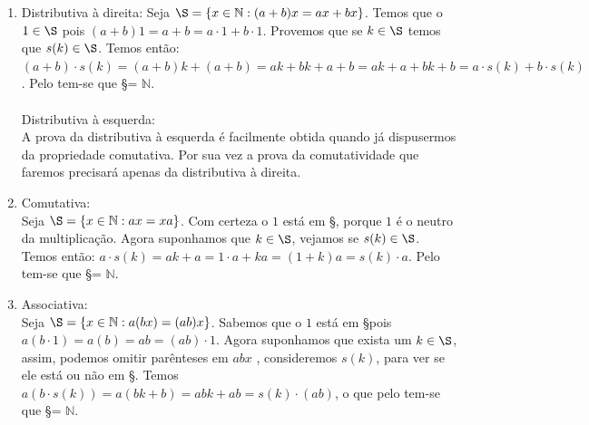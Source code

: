 \documentclass[../main.tex]{subfiles}
\begin{document}
\begin{dem}
\begin{enumerate}[label=(\roman*)]
        \item Distributiva à direita: 
            Seja $\S = \{ x \in \mathbb{N} : ( a + b ) x = ax + bx \}$. Temos que o $1 \in \S$ pois $( a + b ) 1 = a + b = a \cdot 1 + b \cdot 1$. Provemos que se $k \in \S$ temos que $s(k) \in \S$. Temos então: \\
            $( a + b ) \cdot s(k)= ( a + b ) k + ( a + b ) = ak + bk + a + b = ak + a + bk + b 
            = a \cdot s(k) + b \cdot s(k)$. Pelo  tem-se que \S = $\mathbb{N}$.
            \\ \\
            Distributiva à esquerda: \\
            A prova da distributiva à esquerda é facilmente obtida quando já dispusermos da propriedade comutativa. Por sua vez a prova da comutatividade que faremos precisará apenas da distributiva à direita.
        \item Comutativa: \\
            Seja $\S = \{ x \in \mathbb{N} : ax = xa \}$. Com certeza o $1$ está em \S, porque $1$ é o neutro da multiplicação. Agora suponhamos que $k \in \S$, vejamos se $s(k) \in \S$. Temos então: $a \cdot s(k) = ak + a = 1 \cdot a + ka = (1+k)a = s(k) \cdot a$. Pelo  tem-se que \S = $\mathbb{N}$.

        \item Associativa:  \\
            Seja $\S = \{ x \in \mathbb{N} : a(bx) = (ab)x \}$. Sabemos que o $1$ está em \S pois $a (b \cdot 1) = a(b) = ab = (ab)\cdot 1$.
            Agora suponhamos que exista um $k \in \S$, assim, podemos omitir parênteses em $abx$ , consideremos $s(k)$, para ver se ele está ou não em \S. Temos
            $a(b \cdot s(k)) = a(bk + b) = abk + ab = s(k) \cdot  (ab)$, o que pelo  tem-se que \S = $\mathbb{N}$. 
            

\end{enumerate}
\end{dem}
\end{document}
